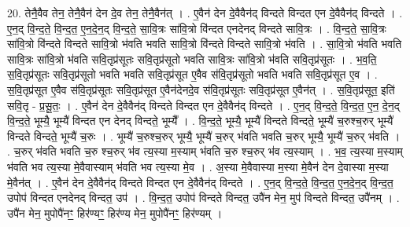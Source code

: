 \documentclass[17pt]{extarticle}
\begin{document}
20. तेनै॒वैव तेन॒ तेनै॒वैन॑ देन दे॒व तेन॒ तेनै॒वैन॑त् । . ए॒वैन॑ देन दे॒वैवैन॑द् विन्दते विन्दत एन दे॒वैवैन॑द् विन्दते । . ए॒न॒द् वि॒न्द॒ते॒ वि॒न्द॒त॒ ए॒न॒दे॒न॒द् वि॒न्द॒ते॒ सा॒वि॒त्रः सा॑वि॒त्रो वि॑न्दत एनदेनद् विन्दते सावि॒त्रः । . वि॒न्द॒ते॒ सा॒वि॒त्रः सा॑वि॒त्रो वि॑न्दते विन्दते सावि॒त्रो भ॑वति भवति सावि॒त्रो वि॑न्दते विन्दते सावि॒त्रो भ॑वति । . सा॒वि॒त्रो भ॑वति भवति सावि॒त्रः सा॑वि॒त्रो भ॑वति सवि॒तृप्र॑सूतः सवि॒तृप्र॑सूतो भवति सावि॒त्रः सा॑वि॒त्रो भ॑वति सवि॒तृप्र॑सूतः । . भ॒व॒ति॒ स॒वि॒तृप्र॑सूतः सवि॒तृप्र॑सूतो भवति भवति सवि॒तृप्र॑सूत ए॒वैव स॑वि॒तृप्र॑सूतो भवति भवति सवि॒तृप्र॑सूत ए॒व । . स॒वि॒तृप्र॑सूत ए॒वैव स॑वि॒तृप्र॑सूतः सवि॒तृप्र॑सूत ए॒वैन॑देनदे॒व स॑वि॒तृप्र॑सूतः सवि॒तृप्र॑सूत ए॒वैन॑त् । . स॒वि॒तृप्र॑सूत॒ इति॑ सवि॒तृ - प्र॒सू॒तः॒ । . ए॒वैन॑ देन दे॒वैवैन॑द् विन्दते विन्दत एन दे॒वैवैन॑द् विन्दते । . ए॒न॒द् वि॒न्द॒ते॒ वि॒न्द॒त॒ ए॒न॒ दे॒न॒द् वि॒न्द॒ते॒ भूम्यै॒ भूम्यै॑ विन्दत एन देनद् विन्दते॒ भूम्यै᳚ । . वि॒न्द॒ते॒ भूम्यै॒ भूम्यै॑ विन्दते विन्दते॒ भूम्यै॑ च॒रुश्च॒रुर् भूम्यै॑ विन्दते विन्दते॒ भूम्यै॑ च॒रुः । . भूम्यै॑ च॒रुश्च॒रुर् भूम्यै॒ भूम्यै॑ च॒रुर् भ॑वति भवति च॒रुर् भूम्यै॒ भूम्यै॑ च॒रुर् भ॑वति । . च॒रुर् भ॑वति भवति च॒रु श्च॒रुर् भ॑व त्य॒स्या म॒स्याम् भ॑वति च॒रु श्च॒रुर् भ॑व त्य॒स्याम् । . भ॒व॒ त्य॒स्या म॒स्याम् भ॑वति भव त्य॒स्या मे॒वैवास्याम् भ॑वति भव त्य॒स्या मे॒व । . अ॒स्या मे॒वैवास्या म॒स्या मे॒वैन॑ देन दे॒वास्या म॒स्या मे॒वैन॑त् । . ए॒वैन॑ देन दे॒वैवैन॑द् विन्दते विन्दत एन दे॒वैवैन॑द् विन्दते । . ए॒न॒द् वि॒न्द॒ते॒ वि॒न्द॒त॒ ए॒न॒दे॒न॒द् वि॒न्द॒त॒ उपोप॑ विन्दत एनदेनद् विन्दत॒ उप॑ । . वि॒न्द॒त॒ उपोप॑ विन्दते विन्दत॒ उपै॑न मेन॒ मुप॑ विन्दते विन्दत॒ उपै॑नम् । . उपै॑न मेन॒ मुपोपै॑नꣳ॒॒ हिर॑ण्यꣳ॒॒ हिर॑ण्य मेन॒ मुपोपै॑नꣳ॒॒ हिर॑ण्यम् । \newline
\end{document}
